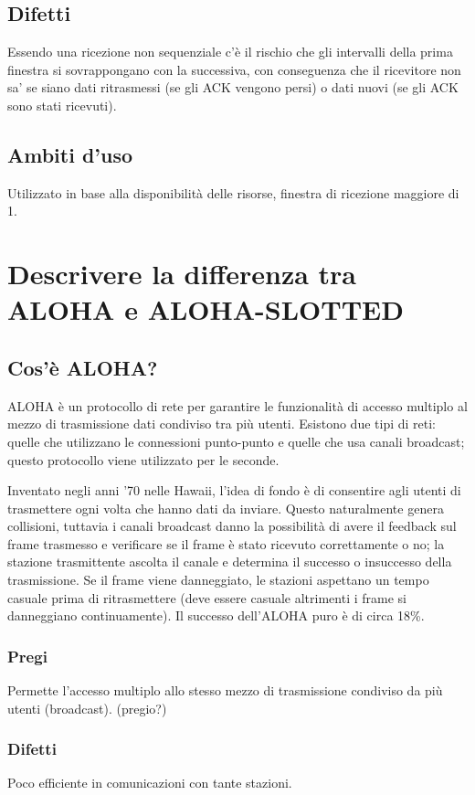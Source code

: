 \subsection{Difetti}
Essendo una ricezione non sequenziale c'è il rischio che gli intervalli della prima finestra si sovrappongano con la successiva, con conseguenza che il ricevitore non sa' se siano dati ritrasmessi (se gli ACK vengono persi) o dati nuovi (se gli ACK sono stati ricevuti).

\subsection{Ambiti d'uso}
Utilizzato in base alla disponibilità delle risorse, finestra di ricezione maggiore di 1.

\section{Descrivere la differenza tra ALOHA e ALOHA-SLOTTED}
\subsection{Cos'è ALOHA?}
ALOHA è un protocollo di rete per garantire le funzionalità di accesso multiplo al mezzo di trasmissione dati condiviso tra più utenti.
Esistono due tipi di reti: quelle che utilizzano le connessioni punto-punto e quelle che usa canali broadcast;
questo protocollo viene utilizzato per le seconde.

Inventato negli anni '70 nelle Hawaii, l'idea di fondo è di consentire agli utenti di trasmettere ogni volta che hanno dati da inviare.
Questo naturalmente genera collisioni, tuttavia i canali broadcast danno la possibilità di avere il feedback sul frame trasmesso e  verificare se il frame è stato ricevuto correttamente o no;
la stazione trasmittente ascolta il canale e determina il successo o insuccesso della trasmissione.
Se il frame viene danneggiato, le stazioni aspettano un tempo casuale prima di ritrasmettere (deve essere casuale altrimenti i frame si danneggiano continuamente).
Il successo dell'ALOHA puro è di circa 18\%.

\subsubsection{Pregi}
Permette l'accesso multiplo allo stesso mezzo di trasmissione condiviso da più utenti (broadcast). (pregio?)

\subsubsection{Difetti}
Poco efficiente in comunicazioni con tante stazioni.

